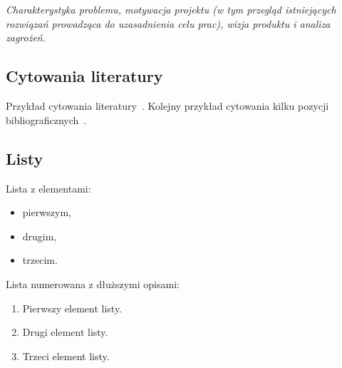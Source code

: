\documentclass[polish]{aghengthesis}
\author{Jan Kowalski, Jan Malinowski, Wojciech Kowalski}
\date{\the\year}
\begin{document}
\maketitle

\tableofcontents

\chapter{\ChapterTitleProjectVision}
\label{sec:cel-wizja}

\emph{Charakterystyka problemu, motywacja projektu (w tym przegląd istniejących rozwiązań prowadząca do uzasadnienia celu prac), wizja produktu i analiza zagrożeń.}

\section{Cytowania literatury}
\label{sec:cytowania}

Przykład cytowania literatury~\cite{wilson2009prediction-interday}. Kolejny przykład
cytowania kilku pozycji bibliograficznych~\cite{allen1999using-genetic, zitzler1999evolutionary-algorithms, pictet1995genetic-algorithms, wilhelmstotter2021jenetics, chmaj2015DistributedProcessingApplications}.

\section{Listy}
\label{sec:listy}

Lista z elementami:
\begin{itemize}
\item pierwszym,
\item drugim,
\item trzecim.
\end{itemize}

Lista numerowana z dłuższymi opisami:
\begin{enumerate}
\item Pierwszy element listy.
\item Drugi element listy.
\item Trzeci element listy.
\end{enumerate}
\end{document}
